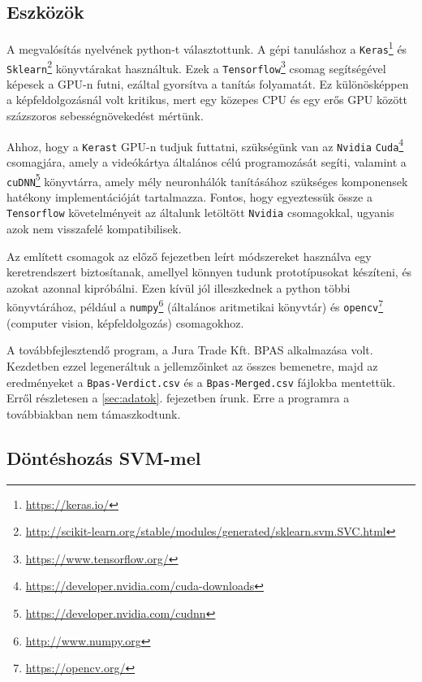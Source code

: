 \subsection{Eszközök}

A megvalósítás nyelvének python-t választottunk.
A gépi tanuláshoz a \texttt{Keras}\footnote{\url{https://keras.io/}} \cite{chollet2015keras} és \texttt{Sklearn}\footnote{\url{http://scikit-learn.org/stable/modules/generated/sklearn.svm.SVC.html}} \cite{pedregosa2011scikit} könyvtárakat 
használtuk. Ezek a \texttt{Tensorflow}\footnote{\url{https://www.tensorflow.org/}} \cite{abadi2016tensorflow} csomag segítségével képesek a
GPU-n futni, ezáltal gyorsítva a tanítás folyamatát. Ez különösképpen a 
képfeldolgozásnál volt kritikus, mert egy közepes CPU és egy erős GPU között
százszoros sebességnövekedést mértünk.

Ahhoz, hogy a \texttt{Kerast} GPU-n tudjuk futtatni, szükségünk van az \texttt{Nvidia}
\texttt{Cuda}\footnote{\url{https://developer.nvidia.com/cuda-downloads}} csomagjára, amely a videókártya általános célú programozását 
segíti, valamint a \texttt{cuDNN}\footnote{\url{https://developer.nvidia.com/cudnn}} könyvtárra, amely mély neuronhálók tanításához 
szükséges komponensek hatékony implementációját tartalmazza. Fontos, hogy egyeztessük
össze a \texttt{Tensorflow} követelményeit az általunk letöltött \texttt{Nvidia} csomagokkal,
ugyanis azok nem visszafelé kompatibilisek.

Az említett csomagok az előző fejezetben leírt módszereket használva egy
keretrendszert biztosítanak, amellyel könnyen tudunk prototípusokat készíteni,
és azokat azonnal kipróbálni. Ezen kívül jól illeszkednek a python többi könyvtárához,
például a \texttt{numpy}\footnote{\url{http://www.numpy.org}} (általános aritmetikai könyvtár) és \texttt{opencv}\footnote{\url{https://opencv.org/}}
(computer vision, képfeldolgozás) csomagokhoz.


A továbbfejlesztendő program, a Jura Trade Kft. BPAS alkalmazása volt. Kezdetben ezzel legeneráltuk
a jellemzőinket az összes bemenetre, majd az eredményeket a \texttt{Bpas-Verdict.csv} és
a \texttt{Bpas-Merged.csv} fájlokba mentettük. Erről részletesen a \ref{sec:adatok}.
fejezetben írunk. Erre a programra a továbbiakban nem támaszkodtunk.



\subsection{Döntéshozás SVM-mel}

